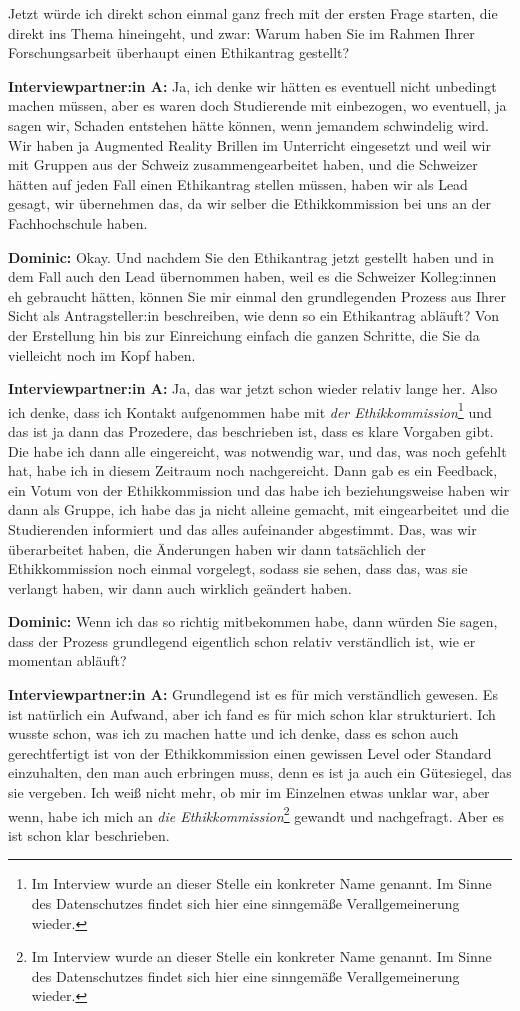 \documentclass[a4paper,12pt,twoside,numbers=noendperiod]{scrreprt}
\begin{document}
Jetzt würde ich direkt schon einmal ganz frech mit der ersten Frage starten, die direkt ins Thema hineingeht, und zwar: Warum haben Sie im Rahmen Ihrer Forschungsarbeit überhaupt einen Ethikantrag gestellt?

\textbf{Interviewpartner:in A:} Ja, ich denke wir hätten es eventuell nicht unbedingt machen müssen, aber es waren doch Studierende mit einbezogen, wo eventuell, ja sagen wir, Schaden entstehen hätte können, wenn jemandem schwindelig wird. Wir haben ja Augmented Reality Brillen im Unterricht eingesetzt und weil wir mit Gruppen aus der Schweiz zusammengearbeitet haben, und die Schweizer hätten auf jeden Fall einen Ethikantrag stellen müssen, haben wir als Lead gesagt, wir übernehmen das, da wir selber die Ethikkommission bei uns an der Fachhochschule haben.

\textbf{Dominic:} Okay. Und nachdem Sie den Ethikantrag jetzt gestellt haben und in dem Fall auch den Lead übernommen haben, weil es die Schweizer Kolleg:innen eh gebraucht hätten, können Sie mir einmal den grundlegenden Prozess aus Ihrer Sicht als Antragsteller:in beschreiben, wie denn so ein Ethikantrag abläuft? Von der Erstellung hin bis zur Einreichung einfach die ganzen Schritte, die Sie da vielleicht noch im Kopf haben.

\textbf{Interviewpartner:in A:} Ja, das war jetzt schon wieder relativ lange her. Also ich denke, dass ich Kontakt aufgenommen habe mit \textit{der Ethikkommission}\footnote{Im Interview wurde an dieser Stelle ein konkreter Name genannt. Im Sinne des Datenschutzes findet sich hier eine sinngemäße Verallgemeinerung wieder.} und das ist ja dann das Prozedere, das beschrieben ist, dass es klare Vorgaben gibt. Die habe ich dann alle eingereicht, was notwendig war, und das, was noch gefehlt hat, habe ich in diesem Zeitraum noch nachgereicht. Dann gab es ein Feedback, ein Votum von der Ethikkommission und das habe ich beziehungsweise haben wir dann als Gruppe, ich habe das ja nicht alleine gemacht, mit eingearbeitet und die Studierenden informiert und das alles aufeinander abgestimmt. Das, was wir überarbeitet haben, die Änderungen haben wir dann tatsächlich der Ethikkommission noch einmal vorgelegt, sodass sie sehen, dass das, was sie verlangt haben, wir dann auch wirklich geändert haben.

\textbf{Dominic:} Wenn ich das so richtig mitbekommen habe, dann würden Sie sagen, dass der Prozess grundlegend eigentlich schon relativ verständlich ist, wie er momentan abläuft?

\textbf{Interviewpartner:in A:} Grundlegend ist es für mich verständlich gewesen. Es ist natürlich ein Aufwand, aber ich fand es für mich schon klar strukturiert. Ich wusste schon, was ich zu machen hatte und ich denke, dass es schon auch gerechtfertigt ist von der Ethikkommission einen gewissen Level oder Standard einzuhalten, den man auch erbringen muss, denn es ist ja auch ein Gütesiegel, das sie vergeben. Ich weiß nicht mehr, ob mir im Einzelnen etwas unklar war, aber wenn, habe ich mich an \textit{die Ethikkommission}\footnote{Im Interview wurde an dieser Stelle ein konkreter Name genannt. Im Sinne des Datenschutzes findet sich hier eine sinngemäße Verallgemeinerung wieder.} gewandt und nachgefragt. Aber es ist schon klar beschrieben.
\end{document}
